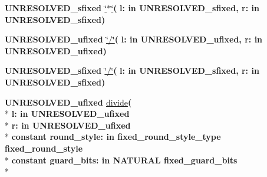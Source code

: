 \begin{DoxyCompactItemize}
\item 
{\bfseries {\bfseries \textcolor{vhdlchar}{U\+N\+R\+E\+S\+O\+L\+V\+E\+D\+\_\+sfixed}\textcolor{vhdlchar}{ }}} \hyperlink{class__fixed__pkg_a12861e11afd1cb6346d3bab7f8e71b9c}{\char`\"{}$\ast$\char`\"{}}{\bfseries  ( }{\bfseries \textcolor{vhdlchar}{l\+: }\textcolor{stringliteral}{in }\textcolor{vhdlchar}{U\+N\+R\+E\+S\+O\+L\+V\+E\+D\+\_\+sfixed}}{\bfseries  , \textcolor{vhdlchar}{r\+: }\textcolor{stringliteral}{in }\textcolor{vhdlchar}{U\+N\+R\+E\+S\+O\+L\+V\+E\+D\+\_\+sfixed}}{\bfseries  )} 
\item 
{\bfseries {\bfseries \textcolor{vhdlchar}{U\+N\+R\+E\+S\+O\+L\+V\+E\+D\+\_\+ufixed}\textcolor{vhdlchar}{ }}} \hyperlink{class__fixed__pkg_a49d0495d91a74b686658a730a25948d1}{\char`\"{}/\char`\"{}}{\bfseries  ( }{\bfseries \textcolor{vhdlchar}{l\+: }\textcolor{stringliteral}{in }\textcolor{vhdlchar}{U\+N\+R\+E\+S\+O\+L\+V\+E\+D\+\_\+ufixed}}{\bfseries  , \textcolor{vhdlchar}{r\+: }\textcolor{stringliteral}{in }\textcolor{vhdlchar}{U\+N\+R\+E\+S\+O\+L\+V\+E\+D\+\_\+ufixed}}{\bfseries  )} 
\item 
{\bfseries {\bfseries \textcolor{vhdlchar}{U\+N\+R\+E\+S\+O\+L\+V\+E\+D\+\_\+sfixed}\textcolor{vhdlchar}{ }}} \hyperlink{class__fixed__pkg_a38133f42dc06bfa3083ee5757db5fdd1}{\char`\"{}/\char`\"{}}{\bfseries  ( }{\bfseries \textcolor{vhdlchar}{l\+: }\textcolor{stringliteral}{in }\textcolor{vhdlchar}{U\+N\+R\+E\+S\+O\+L\+V\+E\+D\+\_\+sfixed}}{\bfseries  , \textcolor{vhdlchar}{r\+: }\textcolor{stringliteral}{in }\textcolor{vhdlchar}{U\+N\+R\+E\+S\+O\+L\+V\+E\+D\+\_\+sfixed}}{\bfseries  )} 
\item 
{\bfseries {\bfseries \textcolor{vhdlchar}{U\+N\+R\+E\+S\+O\+L\+V\+E\+D\+\_\+ufixed}\textcolor{vhdlchar}{ }}} \hyperlink{class__fixed__pkg_ad3f8b999f2e7fa797352933c285309d8}{divide}{\bfseries  ( }\\*
{\bfseries \textcolor{vhdlchar}{l\+: }\textcolor{stringliteral}{in }\textcolor{vhdlchar}{U\+N\+R\+E\+S\+O\+L\+V\+E\+D\+\_\+ufixed}}\\*
{\bfseries \textcolor{vhdlchar}{r\+: }\textcolor{stringliteral}{in }\textcolor{vhdlchar}{U\+N\+R\+E\+S\+O\+L\+V\+E\+D\+\_\+ufixed}}\\*
{\bfseries {\bfseries \textcolor{keywordflow}{constant}\textcolor{vhdlchar}{ }}\textcolor{vhdlchar}{round\+\_\+style\+: }\textcolor{stringliteral}{in }\textcolor{vhdlchar}{fixed\+\_\+round\+\_\+style\+\_\+type     fixed\+\_\+round\+\_\+style}}\\*
{\bfseries {\bfseries \textcolor{keywordflow}{constant}\textcolor{vhdlchar}{ }}\textcolor{vhdlchar}{guard\+\_\+bits\+: }\textcolor{stringliteral}{in }\textcolor{vhdlchar}{N\+A\+T\+U\+R\+A\+L     fixed\+\_\+guard\+\_\+bits}}\\*

\end{DoxyCompactItemize}
